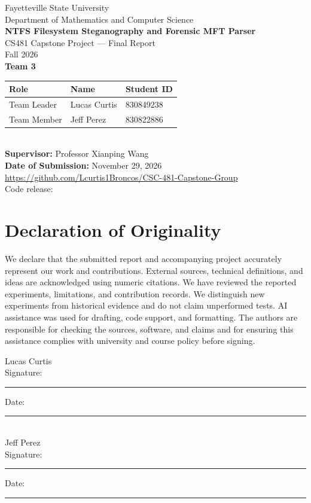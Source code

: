 \documentclass[12pt,letterpaper]{report}
\newcommand{\file}[1]{\path{#1}}
\begin{document}
\hypersetup{pageanchor=false}
\begin{titlepage}
\centering
{\LARGE Fayetteville State University}\\[0.5em]
{\large Department of Mathematics and Computer Science}\\[2.5em]
{\LARGE\bfseries NTFS Filesystem Steganography and Forensic MFT Parser}\\[1.5em]
{\large CS481 Capstone Project --- Final Report}\\[0.5em]
{\large Fall 2026}\\[2em]
\textbf{Team 3}\\[1em]
\begin{tabular}{@{}lll@{}}
\toprule Role & Name & Student ID\\\midrule
Team Leader & Lucas Curtis & 830849238\\[1em]
Team Member & Jeff Perez & 830822886\\\bottomrule
\end{tabular}\\[2em]
\textbf{Supervisor:} Professor Xianping Wang\\[0.7em]
\textbf{Date of Submission:} November 29, 2026
\vfill
\url{https://github.com/Lcurtis1Broncos/CSC-481-Capstone-Group}\\
Code release: \file{v1.0-final}
\end{titlepage}
\hypersetup{pageanchor=true}
\chapter*{Declaration of Originality}
We declare that the submitted report and accompanying project accurately
represent our work and contributions. External sources, technical definitions,
and ideas are acknowledged using numeric citations. We have reviewed the
reported experiments, limitations, and contribution records. We distinguish
new experiments from historical evidence and do not claim unperformed tests.
AI assistance was used for drafting, code support, and formatting. The
authors are responsible for checking the sources, software, and claims and
for ensuring this assistance complies with university and course policy
before signing.

\vspace{2em}
\noindent Lucas Curtis\\[1em]
Signature: \rule{2.8in}{0.4pt}\quad Date: \rule{1in}{0.4pt}\\[2em]
Jeff Perez\\[1em]
Signature: \rule{2.8in}{0.4pt}\quad Date: \rule{1in}{0.4pt}
\end{document}
